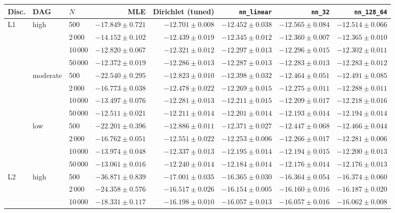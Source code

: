 \begin{tabular}{@{}lllrrrrr@{}}
\toprule
Disc. & DAG & $N$ & MLE & Dirichlet (tuned) & \texttt{nn\_linear} & \texttt{nn\_32} & \texttt{nn\_128\_64} \\
\midrule
L1 & high & 500 & $-17.849 \pm 0.721$ & $-12.701 \pm 0.008$ & $-12.452 \pm 0.038$ & $-12.565 \pm 0.084$ & $-12.514 \pm 0.066$ \\
 &  & 2\,000 & $-14.152 \pm 0.102$ & $-12.439 \pm 0.019$ & $-12.345 \pm 0.012$ & $-12.360 \pm 0.007$ & $-12.365 \pm 0.010$ \\
 &  & 10\,000 & $-12.820 \pm 0.067$ & $-12.321 \pm 0.012$ & $-12.297 \pm 0.013$ & $-12.296 \pm 0.015$ & $-12.302 \pm 0.011$ \\
 &  & 50\,000 & $-12.372 \pm 0.019$ & $-12.286 \pm 0.013$ & $-12.287 \pm 0.013$ & $-12.283 \pm 0.013$ & $-12.283 \pm 0.012$ \\
 & moderate & 500 & $-22.540 \pm 0.295$ & $-12.823 \pm 0.010$ & $-12.398 \pm 0.032$ & $-12.464 \pm 0.051$ & $-12.491 \pm 0.085$ \\
 &  & 2\,000 & $-16.773 \pm 0.038$ & $-12.478 \pm 0.022$ & $-12.269 \pm 0.015$ & $-12.275 \pm 0.011$ & $-12.288 \pm 0.011$ \\
 &  & 10\,000 & $-13.497 \pm 0.076$ & $-12.281 \pm 0.013$ & $-12.211 \pm 0.015$ & $-12.209 \pm 0.017$ & $-12.218 \pm 0.016$ \\
 &  & 50\,000 & $-12.511 \pm 0.021$ & $-12.211 \pm 0.014$ & $-12.201 \pm 0.014$ & $-12.193 \pm 0.014$ & $-12.194 \pm 0.014$ \\
 & low & 500 & $-22.201 \pm 0.396$ & $-12.886 \pm 0.011$ & $-12.371 \pm 0.027$ & $-12.447 \pm 0.068$ & $-12.466 \pm 0.044$ \\
 &  & 2\,000 & $-16.762 \pm 0.051$ & $-12.551 \pm 0.022$ & $-12.253 \pm 0.006$ & $-12.266 \pm 0.017$ & $-12.281 \pm 0.006$ \\
 &  & 10\,000 & $-13.974 \pm 0.048$ & $-12.337 \pm 0.013$ & $-12.195 \pm 0.014$ & $-12.194 \pm 0.015$ & $-12.200 \pm 0.013$ \\
 &  & 50\,000 & $-13.061 \pm 0.016$ & $-12.240 \pm 0.014$ & $-12.184 \pm 0.014$ & $-12.176 \pm 0.014$ & $-12.176 \pm 0.013$ \\
\addlinespace
L2 & high & 500 & $-36.871 \pm 0.839$ & $-17.001 \pm 0.035$ & $-16.365 \pm 0.030$ & $-16.364 \pm 0.054$ & $-16.374 \pm 0.060$ \\
 &  & 2\,000 & $-24.358 \pm 0.576$ & $-16.517 \pm 0.026$ & $-16.154 \pm 0.005$ & $-16.160 \pm 0.016$ & $-16.187 \pm 0.020$ \\
 &  & 10\,000 & $-18.331 \pm 0.117$ & $-16.198 \pm 0.010$ & $-16.057 \pm 0.013$ & $-16.057 \pm 0.016$ & $-16.062 \pm 0.008$ \\

\end{tabular}

